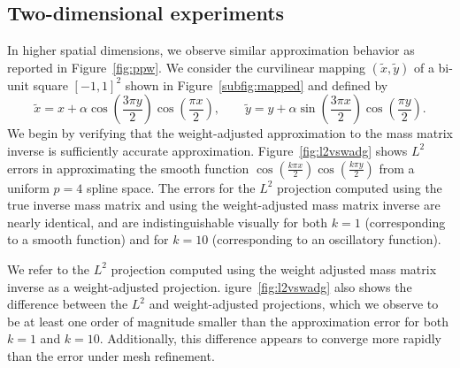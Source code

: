 \documentclass[preprint,10pt]{elsarticle}
\newcommand{\LRp}[1]{\left( #1 \right)}
\begin{document}
\subsection{Two-dimensional experiments}
\label{sec:twodimexp}
In higher spatial dimensions, we observe similar approximation behavior as reported in Figure~\ref{fig:ppw}.  We consider the curvilinear mapping $(\tilde{x},\tilde{y})$ of a bi-unit square $[-1,1]^2$ shown in Figure~\ref{subfig:mapped} and defined by 
\[
\tilde{x} = x + \alpha\cos\LRp{\frac{3 \pi y}{2}} \cos\LRp{\frac{\pi x}{2}}, \qquad \tilde{y} = y + \alpha \sin\LRp{\frac{3 \pi x}{2}}\cos\LRp{\frac{\pi y}{2}}.
\]
We begin by verifying that the weight-adjusted approximation to the mass matrix inverse is sufficiently accurate approximation.  Figure~\ref{fig:l2vswadg} shows $L^2$ errors in approximating the smooth function $\cos\LRp{\frac{k\pi x}{2}}\cos\LRp{\frac{k\pi y}{2}}$ from a uniform $p=4$ spline space.  The errors for the $L^2$ projection computed using the true inverse mass matrix and using the weight-adjusted mass matrix inverse are nearly identical, and are indistinguishable visually for both $k=1$ (corresponding to a smooth function) and for $k=10$ (corresponding to an oscillatory function).  

We refer to the $L^2$ projection computed using the weight adjusted mass matrix inverse as a weight-adjusted projection.  igure~\ref{fig:l2vswadg} also shows the difference between the $L^2$ and weight-adjusted projections, which we observe to be at least one order of magnitude smaller than the approximation error for both $k=1$ and $k=10$.  Additionally, this difference appears to converge more rapidly than the error under mesh refinement.  
\end{document}
